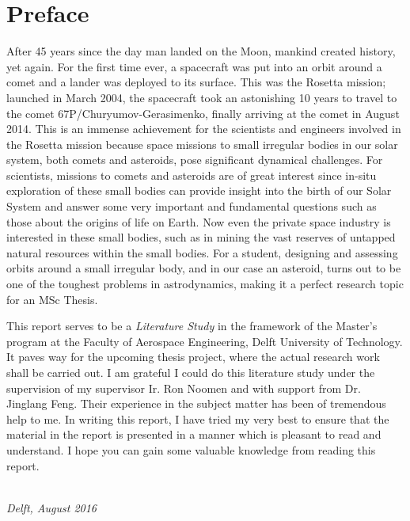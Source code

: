 \chapter*{Preface}
After 45 years since the day man landed on the Moon, mankind created history, yet again. For the first time ever, a spacecraft was put into an orbit around a comet and a lander was deployed to its surface. This was the Rosetta mission; launched in March 2004, the spacecraft took an astonishing 10 years to travel to the comet 67P/Churyumov-Gerasimenko, finally arriving at the comet in August 2014. This is an immense achievement for the scientists and engineers involved in the Rosetta mission because space missions to small irregular bodies in our solar system, both comets and asteroids, pose significant dynamical challenges. For scientists, missions to comets and asteroids are of great interest since in-situ exploration of these small bodies can provide insight into the birth of our Solar System and answer some very important and fundamental questions such as those about the origins of life on Earth. Now even the private space industry is interested in these small bodies, such as in mining the vast reserves of untapped natural resources within the small bodies. For a student, designing and assessing orbits around a small irregular body, and in our case an asteroid, turns out to be one of the toughest problems in astrodynamics, making it a perfect research topic for an MSc Thesis.

This report serves to be a \textit{Literature Study} in the framework of the Master's program at the Faculty of Aerospace Engineering, Delft University of Technology. It paves way for the upcoming thesis project, where the actual research work shall be carried out. I am grateful I could do this literature study under the supervision of my supervisor Ir. Ron Noomen and with support from Dr. Jinglang Feng. Their experience in the subject matter has been of tremendous help to me. In writing this report, I have tried my very best to ensure that the material in the report is presented in a manner which is pleasant to read and understand. I hope you can gain some valuable knowledge from reading this report.

\begin{flushright}
{\makeatletter\itshape
    \@author \\
    Delft, August 2016
\makeatother}
\end{flushright}

